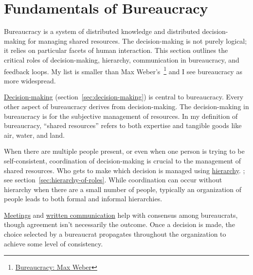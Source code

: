 \section{Fundamentals of Bureaucracy\label{sec:fundamentals-of-b}}
  
Bureaucracy is a system of distributed knowledge and distributed decision-making for managing shared resources. The decision-making is not purely logical; it relies on particular facets of human interaction. This section outlines the critical roles of decision-making, hierarchy, communication in bureaucracy, and feedback loops. 
My list is smaller than Max Weber's~\cite{2015_Weber}\footnote{\href{https://en.wikipedia.org/wiki/Bureaucracy\#Max_Weber}{Bureaucracy: Max Weber}
} and I see bureaucracy as more widespread.

\hyperref[sec:decision-making]{Decision-making}
\ifsectionref
(section~\ref{sec:decision-making}) 
\fi
is central to bureaucracy. Every other aspect of bureaucracy derives from decision-making. The decision-making in bureaucracy is for the subjective management of resources. In my definition of bureaucracy, ``\glspl{shared resource}'' 
refers to both expertise and tangible goods like air, water, and land. 

When there are multiple people present, or even when one person is trying to be self-consistent, coordination of decision-making is crucial to the management of shared resources. Who gets to make which decision is managed using
\hyperref[sec:hierarchy-of-roles]{hierarchy}.
\ifsectionref
; see section~\ref{sec:hierarchy-of-roles}.
\fi
While coordination can occur without hierarchy when there are a small number of people, typically an organization of people leads to both formal and informal hierarchies. 

\hyperref[sec:meetings-for-coordination]{Meetings} and 
\hyperref[sec:written-communication]{written communication} help with consensus among bureaucrats, though agreement isn't necessarily the outcome.
Once a decision is made, the choice selected by a bureaucrat propagates throughout the organization to achieve some level of consistency. 

